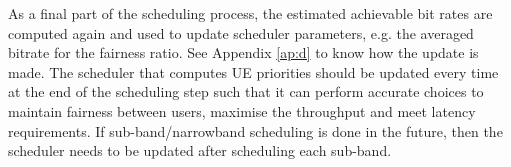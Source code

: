 As a final part of the scheduling process, the estimated achievable bit rates are computed again and used to update scheduler parameters, e.g. the averaged bitrate for the fairness ratio. See Appendix \ref{ap:d} to know how the update is made. The scheduler that computes UE priorities should be updated every time at the end of the scheduling step such that it can perform accurate choices to maintain fairness between users, maximise the throughput and meet latency requirements. If sub-band/narrowband scheduling is done in the future, then the scheduler needs to be updated after scheduling each sub-band.



\begin{comment}

There are three noteworthy remarks about the above:
\begin{itemize}
    \item It can be performed on a narrowband level: we may do the above for portions of the band. The only thing that needs to change across the schedulable bands is the aggregated-across-time throughput metric in the scheduler, or else the resources would be attributed equality anyway. Therefore, instead of the actual aggregated-across-time throughput, we should use and estimated aggregated-across-time throughput, and update that estimation with the expected bitrate each user would get from the schedulable narrowband. For the first portion of band, the estimation and the actual values would be the same. Note that if the scheduler takes into account latencies as well, then the head-of-queue delay value provided to the scheduler must change across narrowbands, it should assume the bits are correctly sent and compute the latency of 'the next packet on the queue'. Or something even smarter, perhaps like considering a few more packets ahead of time, since it will take a while until the scheduling changes.
    

\end{comment}
